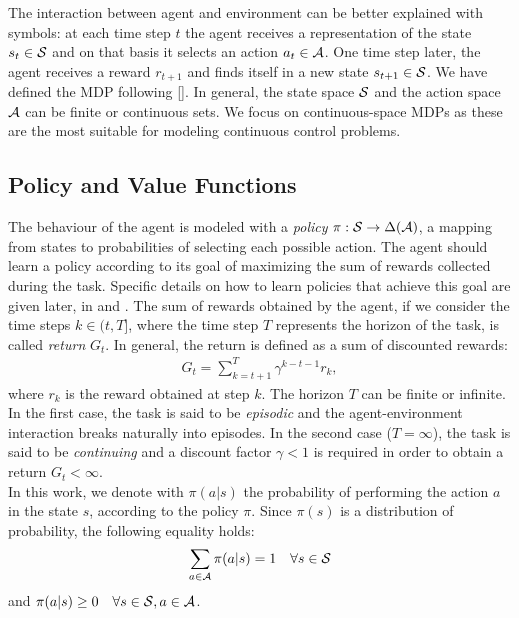 \newline
The interaction between agent and environment can be better explained with symbols: at each time step $t$ the agent receives a representation of the state $s_t \in \mathcal{S}$ and on that basis it selects an action $a_t \in \mathcal{A}$. One time step later, the agent receives a reward $r_{t+1}$ and finds itself in a new state $s_{t+1} \in \mathcal{S}$. We have defined the \ac{MDP} following [\cite{puterman2014markov}]. In general, the state space $\mathcal{S}$ and the action space $\mathcal{A}$ can be finite or continuous sets. We focus on continuous-space \ac{MDPs} as these are the most suitable for modeling continuous control problems.
\subsection{Policy and Value Functions}
The behaviour of the agent is modeled with a \emph{policy} $\pi: \mathcal{S} \to \Delta(\mathcal{A})$, \ie a mapping from states to probabilities of selecting each possible action. The agent should learn a policy according to its goal of maximizing the sum of rewards collected during the task. Specific details on how to learn policies that achieve this goal are given later, in  and . The sum of rewards obtained by the agent, if we consider the time steps $k \in (t, T]$, where the time step $T$ represents the horizon of the task, is called \emph{return} $G_t$. In general, the return is defined as a sum of discounted rewards:
\begin{align}G_t = \sum_{k=t+1}^{T} \gamma^{k-t-1} r_k, \end{align} where $r_k$ is the reward obtained at step $k$. The horizon $T$ can be finite or infinite. In the first case, the task is said to be \emph{episodic} and the agent-environment interaction breaks naturally into episodes. In the second case (\ie $T = \infty$), the task is said to be \emph{continuing} and a discount factor $\gamma<1$ is required in order to obtain a return $G_t < \infty$.\\
\newline
In this work, we denote with $\pi(a|s)$ the probability of performing the action $a$ in the state $s$, according to the policy $\pi$. Since $\pi(s)$ is a distribution of probability, the following equality holds:
\begin{align} \sum_{a \in \mathcal{A}} \pi(a|s) = 1 \quad \forall s \in \mathcal{S} \end{align}
and $\pi(a|s) \geq 0 \quad \forall s \in \mathcal{S}, a \in \mathcal{A}$.
